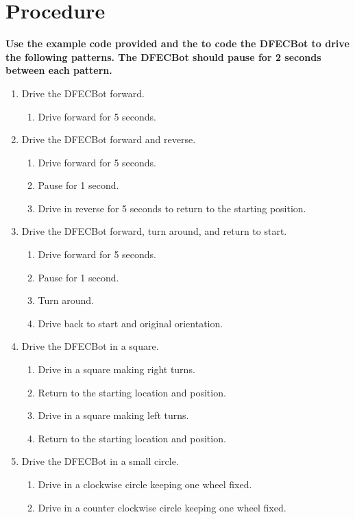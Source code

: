 \documentclass{handout}
\begin{document}
	\section{Procedure}
	\textbf{Use the example code provided and the  to code the DFECBot to drive the following patterns. The DFECBot should pause for 2 seconds between each pattern.}
		
	\begin{enumerate}
		\item Drive the DFECBot forward.
		\begin{enumerate}
			\item Drive forward for 5 seconds.
		\end{enumerate}
		\item Drive the DFECBot forward and reverse.
		\begin{enumerate}
			\item Drive forward for 5 seconds.
			\item Pause for 1 second.
			\item Drive in reverse for 5 seconds to return to the starting position.
		\end{enumerate}
		\item Drive the DFECBot forward, turn around, and return to start.
		\begin{enumerate}
			\item Drive forward for 5 seconds.
			\item Pause for 1 second.
			\item Turn around.
			\item Drive back to start and original orientation.
		\end{enumerate}
		\item Drive the DFECBot in a square.
		\begin{enumerate}
			\item Drive in a square making right turns.
			\item Return to the starting location and position.
			\item Drive in a square making left turns.
			\item Return to the starting location and position.
		\end{enumerate}
		\item Drive the DFECBot in a small circle.
		\begin{enumerate}
			\item Drive in a clockwise circle keeping one wheel fixed.
			\item Drive in a counter clockwise circle keeping one wheel fixed.

\end{enumerate}
\end{enumerate}
\end{document}
